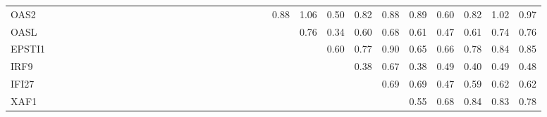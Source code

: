 \begin{longtable}{lrrrrrrrrrrrrrrrrrrrrrrrrrrrrrrrr}
OAS2         &            &              &             &             &             &               &             &             &              &             &             &             &              &              &            &             &             &             &            &            &            &            &       0.88 &         1.06 &       0.50 &        0.82 &       0.88 &       0.89 &          0.60 &               0.82 &      1.02 &      0.97 \\
OASL         &            &              &             &             &             &               &             &             &              &             &             &             &              &              &            &             &             &             &            &            &            &            &            &         0.76 &       0.34 &        0.60 &       0.68 &       0.61 &          0.47 &               0.61 &      0.74 &      0.76 \\
EPSTI1       &            &              &             &             &             &               &             &             &              &             &             &             &              &              &            &             &             &             &            &            &            &            &            &              &       0.60 &        0.77 &       0.90 &       0.65 &          0.66 &               0.78 &      0.84 &      0.85 \\
IRF9         &            &              &             &             &             &               &             &             &              &             &             &             &              &              &            &             &             &             &            &            &            &            &            &              &            &        0.38 &       0.67 &       0.38 &          0.49 &               0.40 &      0.49 &      0.48 \\
IFI27        &            &              &             &             &             &               &             &             &              &             &             &             &              &              &            &             &             &             &            &            &            &            &            &              &            &             &       0.69 &       0.69 &          0.47 &               0.59 &      0.62 &      0.62 \\
XAF1         &            &              &             &             &             &               &             &             &              &             &             &             &              &              &            &             &             &             &            &            &            &            &            &              &            &             &            &       0.55 &          0.68 &               0.84 &      0.83 &      0.78 \\

\end{longtable}
